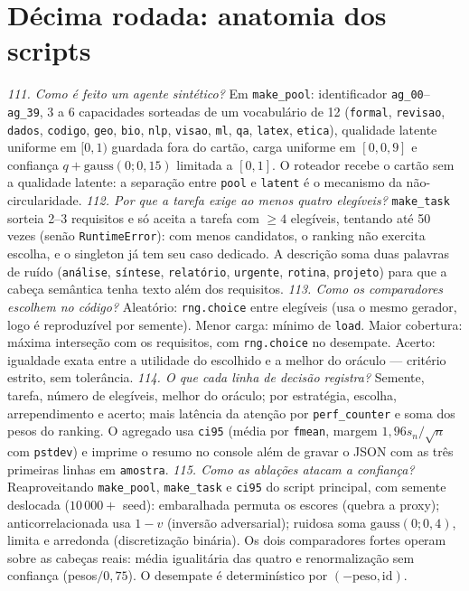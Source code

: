 \section{Décima rodada: anatomia dos scripts}
\textit{111. Como é feito um agente sintético?} Em \texttt{make\_pool}: identificador \texttt{ag\_00}--\texttt{ag\_39}, 3 a 6 capacidades sorteadas de um vocabulário de 12 (\texttt{formal}, \texttt{revisao}, \texttt{dados}, \texttt{codigo}, \texttt{geo}, \texttt{bio}, \texttt{nlp}, \texttt{visao}, \texttt{ml}, \texttt{qa}, \texttt{latex}, \texttt{etica}), qualidade latente uniforme em $[0,1)$ guardada fora do cartão, carga uniforme em $[0,0{,}9]$ e confiança $q+\mathrm{gauss}(0;0{,}15)$ limitada a $[0,1]$. O roteador recebe o cartão sem a qualidade latente: a separação entre \texttt{pool} e \texttt{latent} é o mecanismo da não-circularidade.
\textit{112. Por que a tarefa exige ao menos quatro elegíveis?} \texttt{make\_task} sorteia 2--3 requisitos e só aceita a tarefa com $\geq4$ elegíveis, tentando até 50 vezes (senão \texttt{RuntimeError}): com menos candidatos, o ranking não exercita escolha, e o singleton já tem seu caso dedicado. A descrição soma duas palavras de ruído (\texttt{análise}, \texttt{síntese}, \texttt{relatório}, \texttt{urgente}, \texttt{rotina}, \texttt{projeto}) para que a cabeça semântica tenha texto além dos requisitos.
\textit{113. Como os comparadores escolhem no código?} Aleatório: \texttt{rng.choice} entre elegíveis (usa o mesmo gerador, logo é reproduzível por semente). Menor carga: mínimo de \texttt{load}. Maior cobertura: máxima interseção com os requisitos, com \texttt{rng.choice} no desempate. Acerto: igualdade exata entre a utilidade do escolhido e a melhor do oráculo --- critério estrito, sem tolerância.
\textit{114. O que cada linha de decisão registra?} Semente, tarefa, número de elegíveis, melhor do oráculo; por estratégia, escolha, arrependimento e acerto; mais latência da atenção por \texttt{perf\_counter} e soma dos pesos do ranking. O agregado usa \texttt{ci95} (média por \texttt{fmean}, margem $1{,}96s_n/\sqrt{n}$ com \texttt{pstdev}) e imprime o resumo no console além de gravar o JSON com as três primeiras linhas em \texttt{amostra}.
\textit{115. Como as ablações atacam a confiança?} Reaproveitando \texttt{make\_pool}, \texttt{make\_task} e \texttt{ci95} do script principal, com semente deslocada ($10\,000+$ seed): embaralhada permuta os escores (quebra a proxy); anticorrelacionada usa $1-v$ (inversão adversarial); ruidosa soma $\mathrm{gauss}(0;0{,}4)$, limita e arredonda (discretização binária). Os dois comparadores fortes operam sobre as cabeças reais: média igualitária das quatro e renormalização sem confiança (pesos$/0{,}75$). O desempate é determinístico por $(-\mathrm{peso}, \mathrm{id})$.
